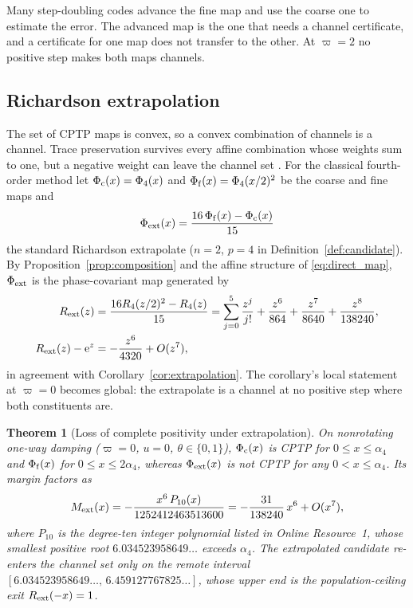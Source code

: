 \documentclass[pdflatex,sn-mathphys-num]{sn-jnl}
\newcommand{\e}{\mathrm{e}}
\theoremstyle{thmstyleone}
\newtheorem{theorem}{Theorem}
\theoremstyle{thmstylethree}
\theoremstyle{thmstyletwo}
\begin{document}
Many step-doubling codes advance the fine map and use the coarse one to estimate the error. The advanced map is the one that needs a channel certificate, and a certificate for one map does not transfer to the other. At $\varpi=2$ no positive step makes both maps channels.

\subsection{Richardson extrapolation}\label{sec:richardson}

The set of CPTP maps is convex, so a convex combination of channels is a channel. Trace preservation survives every affine combination whose weights sum to one, but a negative weight can leave the channel set \cite{Choi1975CP}. For the classical fourth-order method let $\Phi_{\rm c}(x)=\Phi_4(x)$ and $\Phi_{\rm f}(x)=\Phi_4(x/2)^2$ be the coarse and fine maps and
\begin{equation}
 \Phi_{\rm ext}(x)=\frac{16\,\Phi_{\rm f}(x)-\Phi_{\rm c}(x)}{15}
 \label{eq:richardson_map}
\end{equation}
the standard Richardson extrapolate ($n=2$, $p=4$ in Definition~\ref{def:candidate}). By Proposition~\ref{prop:composition} and the affine structure of \eqref{eq:direct_map}, $\Phi_{\rm ext}$ is the phase-covariant map generated by
\begin{equation}
\begin{aligned}
 R_{\rm ext}(z)&=\frac{16R_4(z/2)^2-R_4(z)}{15}=\sum_{j=0}^{5}\frac{z^j}{j!}+\frac{z^6}{864}+\frac{z^7}{8640}+\frac{z^8}{138240},\\
 R_{\rm ext}(z)-\e^z&=-\frac{z^6}{4320}+O(z^7),
\end{aligned}
 \label{eq:richardson_stability}
\end{equation}
in agreement with Corollary~\ref{cor:extrapolation}. The corollary's local statement at $\varpi=0$ becomes global: the extrapolate is a channel at no positive step where both constituents are.

\begin{theorem}[Loss of complete positivity under extrapolation]\label{thm:richardson}
On nonrotating one-way damping ($\varpi=0$, $u=0$, $\theta\in\{0,1\}$), $\Phi_{\rm c}(x)$ is CPTP for $0\le x\le\alpha_4$ and $\Phi_{\rm f}(x)$ for $0\le x\le2\alpha_4$, whereas $\Phi_{\rm ext}(x)$ is not CPTP for any $0<x\le\alpha_4$. Its margin factors as
\begin{equation}
 M_{\rm ext}(x)=-\frac{x^6\,P_{10}(x)}{1252412463513600}=-\frac{31}{138240}\,x^6+O(x^7),
 \label{eq:richardson_margin}
\end{equation}
where $P_{10}$ is the degree-ten integer polynomial listed in Online Resource~1, whose smallest positive root $6.034523958649\ldots$ exceeds $\alpha_4$. The extrapolated candidate re-enters the channel set only on the remote interval $[6.034523958649\ldots,\,6.459127767825\ldots]$, whose upper end is the population-ceiling exit $R_{\rm ext}(-x)=1$.
\end{theorem}
\end{document}
